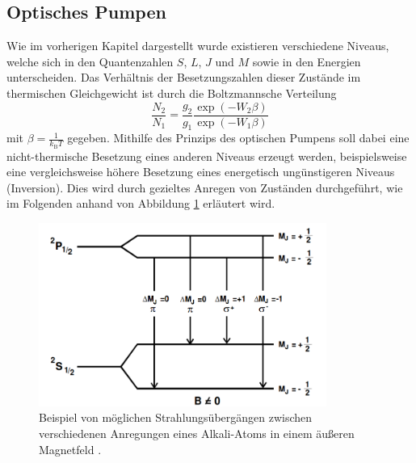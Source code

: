 \subsection{Optisches Pumpen}
Wie im vorherigen Kapitel dargestellt wurde existieren verschiedene Niveaus, welche sich in den Quantenzahlen $S$, $L$, $J$ und $M$ sowie in den Energien unterscheiden.
Das Verhältnis der Besetzungszahlen dieser Zustände im thermischen Gleichgewicht ist durch die Boltzmannsche Verteilung
\begin{equation}
  \frac{N_2}{N_1} = \frac{g_2}{g_1} \frac{ \exp{ \left( - W_2 \beta \right) }}{ \exp{ \left( - W_1 \beta \right)} }
  \label{eqn:1}
\end{equation}
mit $\beta = \frac{1}{k_\text{B} T}$ gegeben.
Mithilfe des Prinzips des optischen Pumpens soll dabei eine nicht-thermische Besetzung eines anderen Niveaus erzeugt werden, beispielsweise eine vergleichsweise höhere Besetzung eines energetisch ungünstigeren Niveaus (Inversion).
Dies wird durch gezieltes Anregen von Zuständen durchgeführt, wie im Folgenden anhand von Abbildung \ref{fig:theorie} erläutert wird.


\begin{figure}
  \centering
  \includegraphics[height=6cm]{ressources/theorie1.png}
  \caption{Beispiel von möglichen Strahlungsübergängen zwischen verschiedenen Anregungen eines Alkali-Atoms in einem äußeren Magnetfeld \cite{skript}.}
  \label{fig:theorie}
\end{figure}

